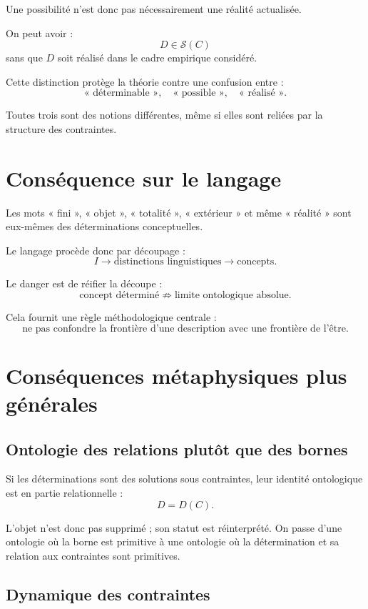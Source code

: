 \documentclass[11pt,a4paper]{article}
\begin{document}
Une possibilité n'est donc pas nécessairement une réalité actualisée.

On peut avoir :
\[
D\in\mathcal S(C)
\]
sans que \(D\) soit réalisé dans le cadre empirique considéré.

Cette distinction protège la théorie contre une confusion entre :
\[
\text{« déterminable »},\quad
\text{« possible »},\quad
\text{« réalisé »}.
\]

Toutes trois sont des notions différentes, même si elles sont reliées par
la structure des contraintes.

\section{Conséquence sur le langage}

Les mots « fini », « objet », « totalité », « extérieur » et même
« réalité » sont eux-mêmes des déterminations conceptuelles.

Le langage procède donc par découpage :
\[
I\to\text{distinctions linguistiques}\to\text{concepts}.
\]

Le danger est de réifier la découpe :
\[
\text{concept déterminé}
\not\Rightarrow
\text{limite ontologique absolue}.
\]

Cela fournit une règle méthodologique centrale :
\[
\boxed{
\text{ne pas confondre la frontière d'une description avec une frontière de l'être.}
}
\]

\section{Conséquences métaphysiques plus générales}

\subsection{Ontologie des relations plutôt que des bornes}

Si les déterminations sont des solutions sous contraintes, leur identité
ontologique est en partie relationnelle :
\[
D=D(C).
\]

L'objet n'est donc pas supprimé ; son statut est réinterprété. On passe d'une
ontologie où la borne est primitive à une ontologie où la détermination et sa
relation aux contraintes sont primitives.

\subsection{Dynamique des contraintes}
\end{document}

